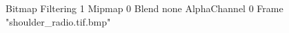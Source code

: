 {Bitmap
	{Filtering 1}
	{Mipmap 0}
	{Blend none}
	{AlphaChannel 0}
	{Frame "shoulder_radio.tif.bmp"}
}

